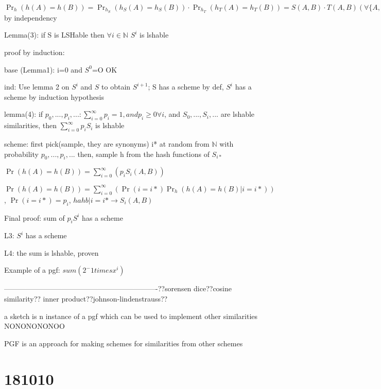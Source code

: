 \documentclass{report}
\begin{document}
	$\Pr_h(h(A)=h(B)) = \Pr_{h_S}(h_S(A)=h_S(B)) \cdot \Pr_{h_T}(h_T(A)=h_T(B)) = S(A, B) \cdot T(A, B) (\forall \{A, B\} \in \mathcal{P}_2(U))$by independency
	
	
	Lemma(3): if S is LSHable then $\forall i \in \mathbb{N}$ $S^i$ is lshable
	
	proof by induction:
	
	base (Lemma1): i=0 and $S^0$=O OK
	
	ind: Use lemma 2 on $S^i$ and $S$ to obtain $S^{i+1}$; S has a scheme by def, $S^i$ has a scheme by induction hypothesis
	
	
	lemma(4): if $p_0, ..., p_i, ... : \sum_{i=0}^{\infty}p_i=1 , and p_i\geq 0 \forall i$, and $S_0, ..., S_i, ...$ are lshable similarities, then $\sum_{i=0}^{\infty}p_iS_i$ is lshable
	
	scheme: first pick(sample, they are synonyms) i* at random from $\mathbb{N}$ with probability $p_0, ..., p_i, ...$
	then, sample h from the hash functions of $S_{i*}$
	
	$\Pr(h(A)=h(B))=\sum_{i=0}^{\infty}(p_i S_i(A, B))$
	
	$\Pr(h(A)=h(B))=\sum_{i=0}^{\infty}(\Pr(i=i*)\Pr_h(h(A)=h(B) | i=i*))$, $\Pr(i=i*) = p_i$, $hahb|i=i* \to S_i(A, B)$
	
	
	Final proof: sum of $p_iS^i$ has a scheme
	
	L3: $S^i$ has a scheme
	
	L4: the sum is lshable, proven
	
	
	Example of a pgf: $sum(2^-1 times x^i)$
	
	
	----------------------------------------------------------------??sorensen dice??cosine similarity?? inner product??johnson-lindenstrauss??
	
	a sketch is n instance of a pgf which can be used to implement other similarities NONONONONOO
	
	
	
	PGF is an approach for making schemes for similarities from other schemes
	
	\section{181010}
	
\end{document}
